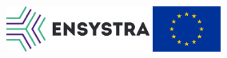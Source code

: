 
\begin{figure}
    \centering
    \begin{minipage}{0.53\textwidth}
        \raggedleft
        \includegraphics[height=1.5cm]{logos/ensystra-ls.png} 
    \end{minipage}\hfill
    \begin{minipage}{0.37\textwidth}
        \raggedright
        \includegraphics[height=1.5cm]{logos/eu.jpg} 
    \end{minipage}
\end{figure}
